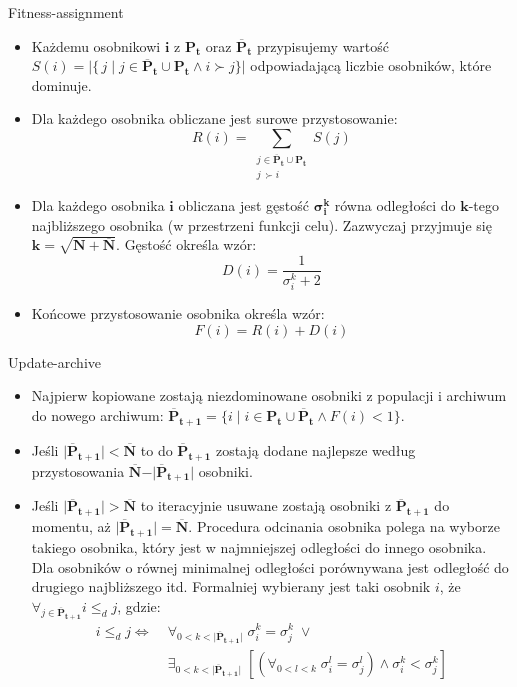 \documentclass{beamer}
\begin{document}
\begin{frame}{Fitness-assignment}
\begin{itemize}
    \item Każdemu osobnikowi $\boldsymbol{i}$ z $\boldsymbol{P_t}$ oraz $\boldsymbol{\overline{P}_t}$ przypisujemy wartość $S(i) = \vert\{ \,j\;\vert\; j\in \boldsymbol{\overline{P}_t} \cup \boldsymbol{P_t} \wedge i \succ j\} \vert$ odpowiadającą liczbie osobników, które dominuje.
    \item Dla każdego osobnika obliczane jest surowe przystosowanie:
    $$R(i) = \sum_{\substack{j\in \boldsymbol{\overline{P}_t} \cup \boldsymbol{P_t} \\ j\, \succ i}} S(j)$$
    \item Dla każdego osobnika $\boldsymbol{i}$ obliczana jest gęstość $\boldsymbol{\sigma_i^k}$ równa odległości do $\boldsymbol{k}$-tego najbliższego osobnika (w przestrzeni funkcji celu). Zazwyczaj przyjmuje się $\boldsymbol{k} = \sqrt{\boldsymbol{N+\overline{N}}}$. Gęstość określa wzór:
    $$D(i) = \frac{1}{\sigma_i^k+2}$$
    \item Końcowe przystosowanie osobnika określa wzór: 
    $$F(i) = R(i) + D(i)$$
\end{itemize}
\end{frame}

\begin{frame}{Update-archive}
    \begin{itemize}
        \item Najpierw kopiowane zostają niezdominowane osobniki z populacji i archiwum do nowego archiwum: $\boldsymbol{\overline{P}_{t+1}} = \{ i \; \vert \; i \in \boldsymbol{P_t} \cup \boldsymbol{\overline{P}_t} \wedge F(i) < 1 \}$.
        \item Jeśli $\vert \boldsymbol{\overline{P}_{t+1}} \vert < \boldsymbol{\overline{N}}$ to do $\boldsymbol{\overline{P}_{t+1}}$ zostają dodane najlepsze według przystosowania $\boldsymbol{\overline{N}} - \vert \boldsymbol{\overline{P}_{t+1}} \vert$ osobniki.
        \item Jeśli $\vert \boldsymbol{\overline{P}_{t+1}} \vert > \boldsymbol{\overline{N}}$ to iteracyjnie usuwane zostają osobniki z  $\boldsymbol{\overline{P}_{t+1}}$ do momentu, aż $\vert \boldsymbol{\overline{P}_{t+1}} \vert = \boldsymbol{\overline{N}}$. Procedura odcinania osobnika polega na wyborze takiego osobnika, który jest w najmniejszej odległości do innego osobnika. Dla osobników o równej minimalnej odległości porównywana jest odległość do drugiego najbliższego itd. Formalniej wybierany jest taki osobnik $i$, że $\forall_{j \in \boldsymbol{\overline{P}_{t+1}}} i \leq_d j$, gdzie:
        \begin{align*}
            i \leq_d j \Leftrightarrow \; & \forall_{0<k<\vert \boldsymbol{\overline{P}_{t+1}} \vert} \; \sigma_i^k = \sigma_j^k \; \vee \\
            & \exists_{0<k<\vert \boldsymbol{\overline{P}_{t+1}} \vert} \; \left[\left(\forall_{0<l<k} \; \sigma_i^l = \sigma_j^l \right) \wedge \sigma_i^k < \sigma_j^k\right]
        \end{align*}
    \end{itemize}
\end{frame}
\end{document}
